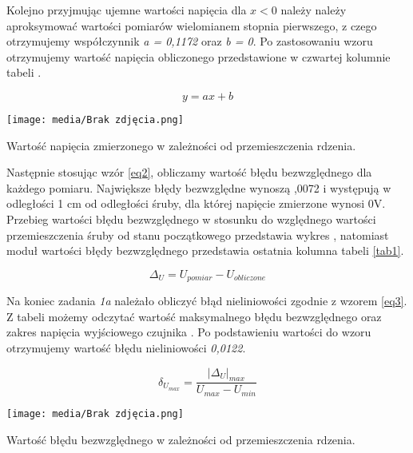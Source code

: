 \documentclass{article}
\begin{document}
\vspace{1em}
Kolejno przyjmując ujemne wartości napięcia dla $x < 0$ należy należy aproksymować wartości pomiarów wielomianem stopnia pierwszego, z czego otrzymujemy współczynnik \textit{a = 0,1172} oraz \textit{b = 0}.  Po zastosowaniu wzoru  otrzymujemy wartość napięcia obliczonego przedstawione w czwartej kolumnie tabeli . 

\begin{equation} \label{eq1}
    y = ax + b
\end{equation}
\newpage



\begin{graph}[ht]
    \centering
    \texttt{[image: media/Brak zdjęcia.png]}
    \caption{Wartość napięcia zmierzonego w zależności od przemieszczenia rdzenia.}
    \label{wyk1}
\end{graph}

Następnie stosując wzór \ref{eq2}, obliczamy wartość błędu bezwzględnego dla każdego pomiaru. Największe błędy bezwzględne wynoszą ,0072 i występują w odległości 1 cm od odległości śruby, dla której napięcie zmierzone wynosi 0V. Przebieg wartości błędu bezwzględnego w stosunku do względnego wartości przemieszczenia śruby od stanu początkowego przedstawia wykres , natomiast moduł wartości błędy bezwzględnego przedstawia ostatnia kolumna tabeli \ref{tab1}.


\begin{equation} \label{eq2}
    \Delta_U = U_{pomiar} - U_{obliczone}
\end{equation}


\newpage
Na koniec zadania \textit{1a} należało obliczyć błąd nieliniowości zgodnie z wzorem \ref{eq3}. Z tabeli możemy odczytać wartość maksymalnego błędu bezwzględnego oraz zakres napięcia wyjściowego czujnika . Po podstawieniu wartości do wzoru otrzymujemy wartość błędu nieliniowości \textit{0,0122}.


\begin{equation} \label{eq3}
    \delta_{U_{max}} = \frac{|\Delta_U|_{max}}{U_{max} - U_{min}}
\end{equation}

\begin{graph}[ht]
    \centering
    \texttt{[image: media/Brak zdjęcia.png]}
    \caption{Wartość błędu bezwzględnego w zależności od przemieszczenia rdzenia.}
    \label{wyk2}
\end{graph}
\end{document}

